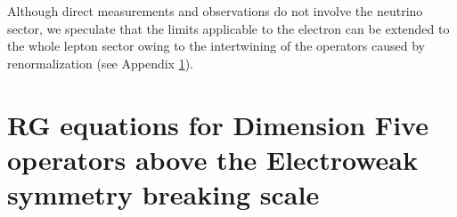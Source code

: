 \documentclass[12pt]{revtex4}
\begin{document}
	


	Although direct measurements and observations do not involve the neutrino sector,
	we speculate that the limits applicable to the electron can be extended to
	the whole lepton sector owing to the intertwining of the operators caused by
	renormalization (see Appendix \ref{RG_SM}).
	
	

\newpage
%
%
\appendix
\section{RG equations for Dimension Five operators 
	above the Electroweak symmetry breaking scale}
\label{RG_SM}
\end{document}
